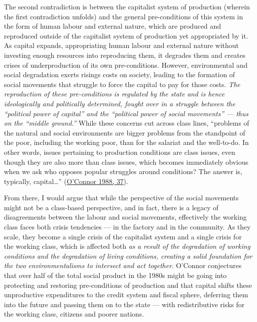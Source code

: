 \documentclass[a4paper, nobind]{templates/ociamthesis}
\begin{document}
The second contradiction is between the capitalist system of production (wherein the first contradiction unfolds) and the general pre-conditions of this system in the form of human labour and external nature, which are produced and reproduced outside of the capitalist system of production yet appropriated by it. As capital expands, appropriating human labour and external nature without investing enough resources into reproducing them, it degrades them and creates crises of underproduction of its own pre-conditions. However, environmental and social degradation exerts risings costs on society, leading to the formation of social movements that struggle to force the capital to pay for those costs. \emph{The reproduction of these pre-conditions is regulated by the state and is hence ideologically and politically determined, fought over in a struggle between the ``political power of capital'' and the ``political power of social movements'' --- thus on the ``middle ground.''} While these concerns cut across class lines, ``problems of the natural and social environments are bigger problems from the standpoint of the poor, including the working poor, than for the salariat and the well-to-do. In other words, issues pertaining to production conditions are class issues, even though they are also more than class issues, which becomes immediately obvious when we ask who opposes popular struggles around conditions? The answer is, typically, capital\ldots{}'' (\protect\hyperlink{ref-oconnor_capitalism_1988}{O'Connor 1988, 37}).

From there, I would argue that while the perspective of the social movements might not be a class-based perspective, and in fact, there is a legacy of disagreements between the labour and social movements, effectively the working class faces both crisis tendencies --- in the factory and in the community. As they scale, they become a single crisis of the capitalist system and a single crisis for the working class, which is affected both \emph{as a result of the degradation of working conditions and the degradation of living conditions, creating a solid foundation for the two environmentalisms to intersect and act together}. O'Connor conjectures that over half of the total social product in the 1980s might be going into protecting and restoring pre-conditions of production and that capital shifts these unproductive expenditures to the credit system and fiscal sphere, deferring them into the future and passing them on to the state --- with redistributive risks for the working class, citizens and poorer nations.
\end{document}

